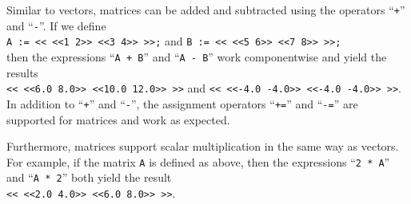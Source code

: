 Similar to vectors, matrices can be added and subtracted using the operators ``\texttt{+}'' and
``\texttt{-}''.   If we define
\\[0.2cm]
\hspace*{1.3cm}
\texttt{A := << <<1 2>> <<3 4>> >>;} \quad and \quad \texttt{B := << <<5 6>> <<7 8>> >>;}   
\\[0.2cm]
then the expressions ``\texttt{A + B}'' and ``\texttt{A - B}'' work componentwise and yield the
results 
\\[0.2cm]
\hspace*{1.3cm}
\texttt{<< <<6.0 8.0>> <<10.0 12.0>> >>} \quad and \quad 
\texttt{<< <<-4.0 -4.0>> <<-4.0 -4.0>> >>}.
\\[0.2cm]
In addition to ``\texttt{+}'' and ``\texttt{-}'', the assignment operators ``\texttt{+=}'' and
``\texttt{-=}'' are supported for matrices and work as expected.

Furthermore, matrices support scalar multiplication in the same way as vectors.  For example, if the
matrix \texttt{A} is defined as above, then the expressions 
``\texttt{2 * A}'' and ``\texttt{A * 2}'' both yield the result
\\[0.2cm]
\hspace*{1.3cm}
\texttt{<< <<2.0 4.0>> <<6.0 8.0>> >>}.
\vspace*{0.2cm} 

